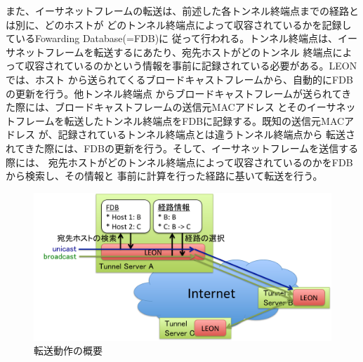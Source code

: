 また、イーサネットフレームの転送は、前述した各トンネル終端点までの経路とは別に、どのホストが
どのトンネル終端点によって収容されているかを記録しているFowarding Database(=FDB)に
従って行われる。トンネル終端点は、イーサネットフレームを転送するにあたり、宛先ホストがどのトンネル
終端点によって収容されているのかという情報を事前に記録されている必要がある。LEONでは、ホスト
から送られてくるブロードキャストフレームから、自動的にFDBの更新を行う。他トンネル終端点
からブロードキャストフレームが送られてきた際には、ブロードキャストフレームの送信元MACアドレス
とそのイーサネットフレームを転送したトンネル終端点をFDBに記録する。既知の送信元MACアドレス
が、記録されているトンネル終端点とは違うトンネル終端点から
転送されてきた際には、FDBの更新を行う。そして、イーサネットフレームを送信する際には、
宛先ホストがどのトンネル終端点によって収容されているのかをFDBから検索し、その情報と
事前に計算を行った経路に基いて転送を行う。

\begin{figure}
	\begin{center}
		\includegraphics[scale=0.60]{./img/forwardabst}
		\caption{転送動作の概要}
		\label{img:forwardabst}
	\end{center}
\end{figure}

